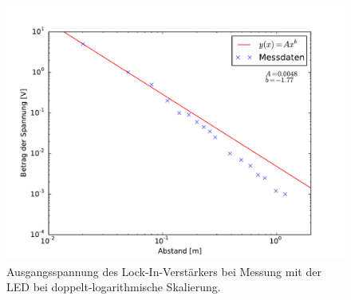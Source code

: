 \begin{figure}[hbp]
	\centering
		\includegraphics[width=\textwidth]{Bilder/LED_log.pdf}
	\caption{Ausgangsspannung des Lock-In-Verstärkers bei Messung mit der LED  bei doppelt-logarithmische Skalierung.}
	\label{diag:LED}
\end{figure}
